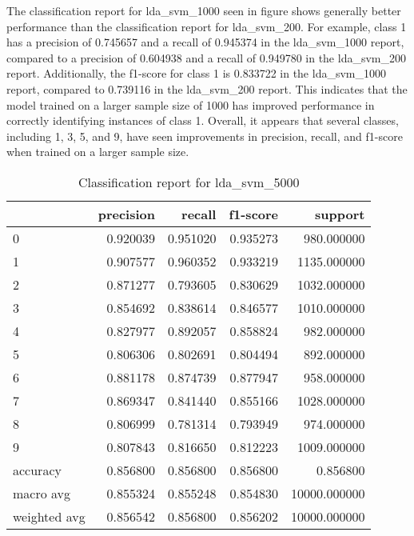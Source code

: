 The classification report for lda_svm_1000 seen in figure shows generally better performance than the classification report for lda_svm_200. For example, class 1 has a precision of 0.745657 and a recall of 0.945374 in the lda_svm_1000 report, compared to a precision of 0.604938 and a recall of 0.949780 in the lda_svm_200 report. Additionally, the f1-score for class 1 is 0.833722 in the lda_svm_1000 report, compared to 0.739116 in the lda_svm_200 report. This indicates that the model trained on a larger sample size of 1000 has improved performance in correctly identifying instances of class 1. Overall, it appears that several classes, including 1, 3, 5, and 9, have seen improvements in precision, recall, and f1-score when trained on a larger sample size.


\begin{table}[htb!]
    \centering
    \caption{Classification report for lda_svm_5000}
    \label{tab:classification-report-lda_svm_5000}
    \begin{tabular}{lrrrr}
    \toprule
     & precision & recall & f1-score & support \\
    \midrule
    0 & 0.920039 & 0.951020 & 0.935273 & 980.000000 \\
    1 & 0.907577 & 0.960352 & 0.933219 & 1135.000000 \\
    2 & 0.871277 & 0.793605 & 0.830629 & 1032.000000 \\
    3 & 0.854692 & 0.838614 & 0.846577 & 1010.000000 \\
    4 & 0.827977 & 0.892057 & 0.858824 & 982.000000 \\
    5 & 0.806306 & 0.802691 & 0.804494 & 892.000000 \\
    6 & 0.881178 & 0.874739 & 0.877947 & 958.000000 \\
    7 & 0.869347 & 0.841440 & 0.855166 & 1028.000000 \\
    8 & 0.806999 & 0.781314 & 0.793949 & 974.000000 \\
    9 & 0.807843 & 0.816650 & 0.812223 & 1009.000000 \\
    accuracy & 0.856800 & 0.856800 & 0.856800 & 0.856800 \\
    macro avg & 0.855324 & 0.855248 & 0.854830 & 10000.000000 \\
    weighted avg & 0.856542 & 0.856800 & 0.856202 & 10000.000000 \\
    \bottomrule
    \end{tabular}
    \end{table}


